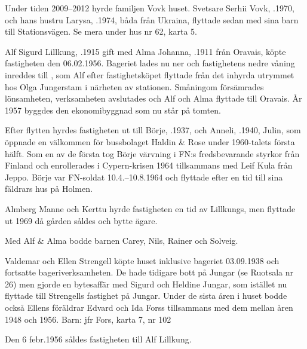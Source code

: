 Under tiden 2009--2012 hyrde familjen Vovk huset. Svetsare Serhii Vovk, .1970, och hans hustru Larysa, .1974, båda från Ukraina, flyttade sedan med sina barn till Stationsvägen. Se mera under hus nr 62, karta 5.

%
Alf Sigurd Lillkung, .1915 gift med Alma Johanna, .1911 från Oravais, köpte fastigheten den 06.02.1956. Bageriet lades nu ner och fastighetens nedre våning inreddes till , som Alf efter fastighetsköpet flyttade från det inhyrda utrymmet hos Olga Jungerstam i närheten av stationen. Småningom försämrades lönsamheten, verksamheten avslutades och Alf och Alma flyttade till Oravais. År 1957 byggdes den ekonomibyggnad som nu står på tomten.

Efter flytten hyrdes fastigheten ut till Börje, .1937, och Anneli, .1940, Julin, som öppnade en välkommen  för bussbolaget Haldin \& Rose under 1960-talets första hälft. Som en av de första tog Börje värvning i FN:s fredsbevarande styrkor från Finland och enrollerades i Cypern-krisen 1964 tillsammans med Leif Kula från Jeppo. Börje var FN-soldat 10.4.--10.8.1964 och flyttade efter en tid till sina fäldrars hus på Holmen.

Almberg Manne och Kerttu hyrde fastigheten en tid av Lillkungs, men flyttade ut 1969 då gården såldes och bytte ägare.

Med Alf \& Alma bodde barnen Carey, Nils, Rainer och Solveig.


%
Valdemar och Ellen Strengell köpte huset inklusive bageriet 03.09.1938 och fortsatte bageriverksamheten. De hade tidigare bott på Jungar (se Ruotsala nr 26) men gjorde en bytesaffär med Sigurd och Heldine Jungar, som istället nu flyttade till Strengells fastighet på Jungar. Under de sista åren i huset bodde också Ellens föräldrar Edvard och Ida Forss tillsammans med dem mellan åren 1948 och 1956.
Barn: jfr Fors, karta 7, nr 102

Den 6 febr.1956 såldes fastigheten till Alf Lillkung.


